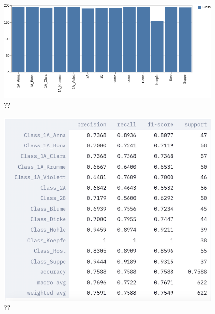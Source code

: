 \begin{figure}[h]
	\centering
	\includegraphics[scale=0.55]{Figures/chapter04/ftl_visualization.png}
	\decoRule
	\caption[??]{??}
	\label{fig:FeatureToLabelVisualization}
\end{figure}

\begin{figure}[h]
	\centering
	\includegraphics[scale=0.5]{Figures/chapter04/ftl_classification_report.png}
	\decoRule
	\caption[??]{??}
	\label{fig:FeatureToLabelReport}
\end{figure}

